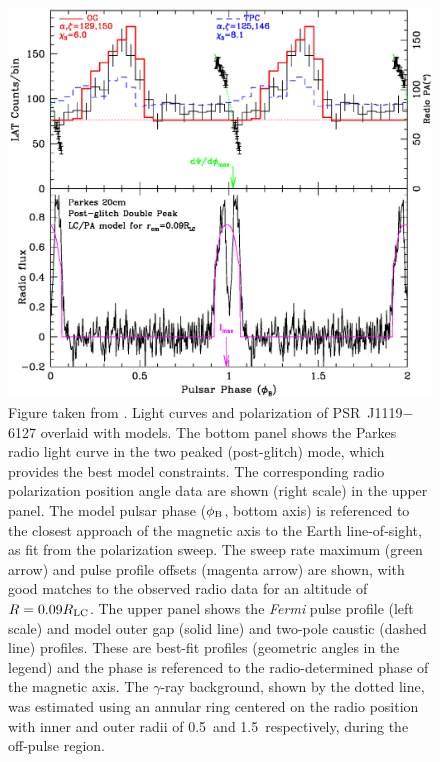 \begin{figure}
\begin{center}
\includegraphics[scale=0.75]{chapters/multiWaveLength/figures/HBP_fig4_rev.eps}
\caption[Light curves and radio polarization of PSR~J1119$-$6127 overlaid with models]{
Figure taken from \cite{parent2011observations}.
Light curves and polarization of PSR~J1119$-$6127 overlaid with models. The bottom panel shows the Parkes
radio light curve in the two peaked (post-glitch) mode, which provides the best
model constraints. The corresponding radio polarization position angle data are
shown (right scale) in the upper panel. The model pulsar phase ($\phi_{\rm{B}}$, bottom axis) is
referenced to the closest approach of the magnetic axis to the Earth
line-of-sight, as fit from the polarization sweep. The sweep rate maximum
(green arrow) and pulse profile offsets (magenta arrow) are shown, with good
matches to the observed radio data for an altitude of $R=0.09 R_{\rm{LC}}$. The
upper panel shows the {\it Fermi} pulse profile (left scale) and model outer gap (solid line)
and two-pole caustic (dashed line) profiles. These are best-fit profiles (geometric angles
in the legend) and the phase is referenced to the radio-determined phase of the
magnetic axis. The $\gamma$-ray background, shown by the dotted line, was
estimated using an annular ring centered on the radio position with inner and
outer radii of 0.5\degr\ and 1.5\degr\ respectively, during the off-pulse
region. \label{fig:roger_lcs} } \end{center}
\end{figure}


